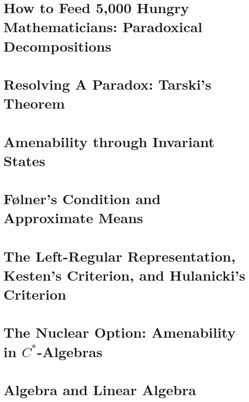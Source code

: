 \documentclass[11pt]{package2}
\begin{document}
\chapter{How to Feed 5,000 Hungry Mathematicians: Paradoxical Decompositions}\label{ch:paradoxical_decompositions}

\chapter{Resolving A Paradox: Tarski's Theorem}\label{ch:tarskis_theorem}

\chapter{Amenability through Invariant States}\label{ch:invariant_states}

\chapter{Følner's Condition and Approximate Means}\label{ch:folner_condition}

\chapter{The Left-Regular Representation, Kesten's Criterion, and Hulanicki's Criterion}\label{ch:left_regular_representation}
\chapter{The Nuclear Option: Amenability in \texorpdfstring{$C^{\ast}$-Algebras}{C*-Algebras}}\label{ch:nuclearity}
\appendix
\chapter{Algebra and Linear Algebra}\label{ch:algebra_and_linear_algebra}

\end{document}
